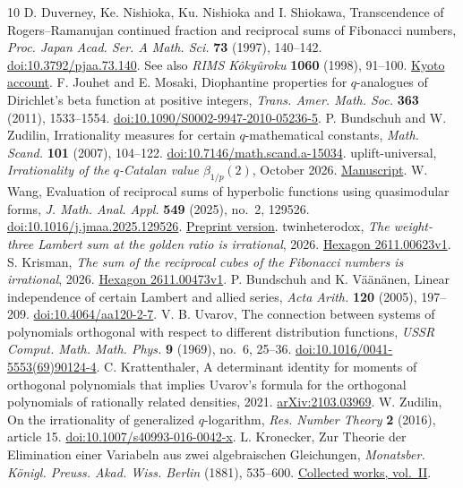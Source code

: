 \documentclass[11pt,letterpaper]{article}
\begin{document}
\clearpage
\small
\begin{thebibliography}{10}
\setlength{\itemsep}{2pt}
D. Duverney, Ke. Nishioka, Ku. Nishioka and I. Shiokawa,
Transcendence of Rogers--Ramanujan continued fraction and reciprocal
sums of Fibonacci numbers, \emph{Proc. Japan Acad. Ser. A Math. Sci.}
\textbf{73} (1997), 140--142.
\href{https://doi.org/10.3792/pjaa.73.140}{doi:10.3792/pjaa.73.140}.
See also \emph{RIMS K\^oky\^uroku} \textbf{1060} (1998), 91--100.
\href{https://www.kurims.kyoto-u.ac.jp/~kyodo/kokyuroku/contents/pdf/1060-10.pdf}{Kyoto account}.
F. Jouhet and E. Mosaki,
Diophantine properties for \(q\)-analogues of Dirichlet's beta function
at positive integers, \emph{Trans. Amer. Math. Soc.} \textbf{363}
(2011), 1533--1554. \href{https://doi.org/10.1090/S0002-9947-2010-05236-5}{doi:10.1090/S0002-9947-2010-05236-5}.
P. Bundschuh and W. Zudilin, Irrationality measures for certain
\(q\)-mathematical constants, \emph{Math. Scand.} \textbf{101}
(2007), 104--122.
\href{https://doi.org/10.7146/math.scand.a-15034}{doi:10.7146/math.scand.a-15034}.
uplift-universal, \emph{Irrationality of the \(q\)-Catalan value
\(\beta_{1/p}(2)\)}, October 2026.
\href{https://github.com/uplift-universal-inc/q-catalan-irrationality/blob/main/paper/main.pdf}{Manuscript}.
W. Wang, Evaluation of reciprocal sums of hyperbolic functions using
quasimodular forms, \emph{J. Math. Anal. Appl.} \textbf{549} (2025),
no.~2, 129526. \href{https://doi.org/10.1016/j.jmaa.2025.129526}{doi:10.1016/j.jmaa.2025.129526}.
\href{https://arxiv.org/abs/2312.16929v1}{Preprint version}.
twinheterodox, \emph{The weight-three Lambert sum at the golden ratio is
irrational}, 2026. \href{https://hexagonmath.org/2611.00623v1}{Hexagon 2611.00623v1}.
S. Krisman, \emph{The sum of the reciprocal cubes of the Fibonacci
numbers is irrational}, 2026. \href{https://hexagonmath.org/2611.00473v1}{Hexagon 2611.00473v1}.
P. Bundschuh and K. Väänänen, Linear independence of certain Lambert
and allied series, \emph{Acta Arith.} \textbf{120} (2005), 197--209.
\href{https://doi.org/10.4064/aa120-2-7}{doi:10.4064/aa120-2-7}.
V. B. Uvarov, The connection between systems of polynomials orthogonal
with respect to different distribution functions,
\emph{USSR Comput. Math. Math. Phys.} \textbf{9} (1969), no.~6, 25--36.
\href{https://doi.org/10.1016/0041-5553(69)90124-4}{doi:10.1016/0041-5553(69)90124-4}.
C. Krattenthaler, A determinant identity for moments of orthogonal
polynomials that implies Uvarov's formula for the orthogonal polynomials
of rationally related densities, 2021.
\href{https://arxiv.org/abs/2103.03969}{arXiv:2103.03969}.
W. Zudilin, On the irrationality of generalized \(q\)-logarithm,
\emph{Res. Number Theory} \textbf{2} (2016), article 15.
\href{https://doi.org/10.1007/s40993-016-0042-x}{doi:10.1007/s40993-016-0042-x}.
L. Kronecker, Zur Theorie der Elimination einer Variabeln aus zwei
algebraischen Gleichungen, \emph{Monatsber. K\"onigl. Preuss. Akad.
Wiss. Berlin} (1881), 535--600.
\href{https://www.e-rara.ch/download/pdf/5761162.pdf\#page=42}{Collected works, vol.~II}.
\end{thebibliography}
\end{document}

